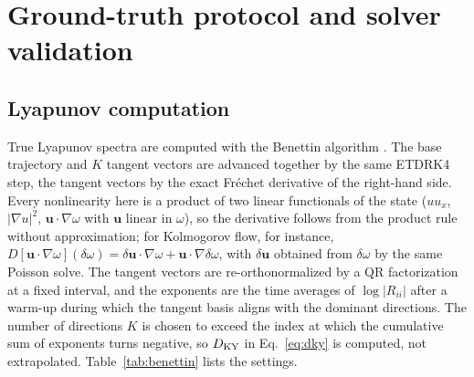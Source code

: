 \section{Ground-truth protocol and solver validation}
\label{app:groundtruth}

\subsection{Lyapunov computation}
\label{app:benettin}

True Lyapunov spectra are computed with the Benettin algorithm
\citep{benettin1980}. The base trajectory and $K$ tangent vectors are
advanced together by the same ETDRK4 step, the tangent vectors by the
exact Fr\'echet derivative of the right-hand side. Every nonlinearity
here is a product of two linear functionals of the state ($uu_x$,
$|\nabla u|^2$, $\bm u\cdot\nabla\omega$ with $\bm u$ linear in $\omega$),
so the derivative follows from the product rule without approximation;
for Kolmogorov flow, for instance,
$D[\bm u\cdot\nabla\omega](\delta\omega) = \delta\bm u\cdot\nabla\omega +
\bm u\cdot\nabla\delta\omega$, with $\delta\bm u$ obtained from
$\delta\omega$ by the same Poisson solve. The tangent vectors are
re-orthonormalized by a QR factorization at a fixed interval, and the
exponents are the time averages of $\log|R_{ii}|$ after a warm-up during
which the tangent basis aligns with the dominant directions. The
number of directions $K$ is chosen to exceed the index at which the cumulative
sum of exponents turns negative, so $D_{\mathrm{KY}}$ in Eq.~\eqref{eq:dky} is
computed, not extrapolated. Table~\ref{tab:benettin} lists the settings.

